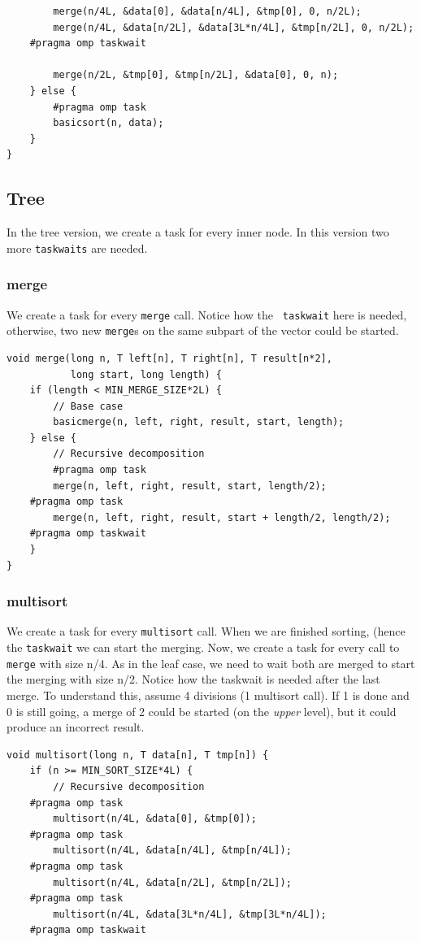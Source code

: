 \documentclass[a4paper,11pt]{article}
\begin{document}
\begin{enumerate}
\begin{verbatim}
        merge(n/4L, &data[0], &data[n/4L], &tmp[0], 0, n/2L);
        merge(n/4L, &data[n/2L], &data[3L*n/4L], &tmp[n/2L], 0, n/2L);
	#pragma omp taskwait

        merge(n/2L, &tmp[0], &tmp[n/2L], &data[0], 0, n);
    } else {
        #pragma omp task
        basicsort(n, data);
    }
}
\end{verbatim}

\subsection{Tree}

In the tree version, we create a task for every inner node. In this version
two more {\tt taskwaits} are needed.

\subsubsection{merge}
We create a task for every {\tt merge} call. Notice how the {\tt
  taskwait} here is needed, otherwise, two new {\tt merge}s on the
same subpart of the vector could be started.

\begin{verbatim}
void merge(long n, T left[n], T right[n], T result[n*2],
           long start, long length) {
    if (length < MIN_MERGE_SIZE*2L) {
        // Base case
        basicmerge(n, left, right, result, start, length);
    } else {
        // Recursive decomposition
        #pragma omp task
        merge(n, left, right, result, start, length/2);
	#pragma omp task
        merge(n, left, right, result, start + length/2, length/2);
	#pragma omp taskwait
    }
}
\end{verbatim}

\subsubsection{multisort}
We create a task for every {\tt multisort} call. When we are finished
sorting, (hence the {\tt taskwait} we can start the merging. Now, we
create a task for every call to {\tt merge} with size n/4. As in the
leaf case, we need to wait both are merged to start the merging with
size n/2. Notice how the taskwait is needed after the last merge. To
understand this, assume 4 divisions (1 multisort call). If 1 is done
and 0 is still going, a merge of 2 could be started (on the
\emph{upper} level), but it could produce an incorrect result.

\begin{verbatim}
void multisort(long n, T data[n], T tmp[n]) {
    if (n >= MIN_SORT_SIZE*4L) {
        // Recursive decomposition
	#pragma omp task
        multisort(n/4L, &data[0], &tmp[0]);
	#pragma omp task
        multisort(n/4L, &data[n/4L], &tmp[n/4L]);
	#pragma omp task
        multisort(n/4L, &data[n/2L], &tmp[n/2L]);
	#pragma omp task
        multisort(n/4L, &data[3L*n/4L], &tmp[3L*n/4L]);
	#pragma omp taskwait


\end{verbatim}
\end{enumerate}
\end{document}
